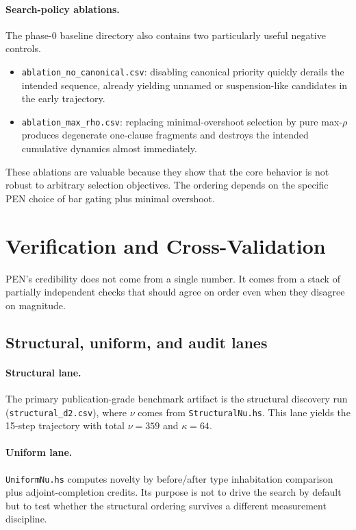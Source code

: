 \documentclass[11pt,a4paper]{article}
\begin{document}
\paragraph{Search-policy ablations.}
The phase-0 baseline directory also contains two particularly useful negative controls.
\begin{itemize}[nosep]
  \item \texttt{ablation\_no\_canonical.csv}: disabling canonical priority quickly derails the intended sequence, already yielding unnamed or suspension-like candidates in the early trajectory.
  \item \texttt{ablation\_max\_rho.csv}: replacing minimal-overshoot selection by pure max-$\rho$ produces degenerate one-clause fragments and destroys the intended cumulative dynamics almost immediately.
\end{itemize}
These ablations are valuable because they show that the core behavior is not robust to arbitrary selection objectives. The ordering depends on the specific PEN choice of bar gating plus minimal overshoot.

\section{Verification and Cross-Validation}
\label{sec:verification}

PEN's credibility does not come from a single number. It comes from a stack of partially independent checks that should agree on order even when they disagree on magnitude.

\subsection{Structural, uniform, and audit lanes}

\paragraph{Structural lane.}
The primary publication-grade benchmark artifact is the structural discovery run (\texttt{structural\_d2.csv}), where $\nu$ comes from \texttt{StructuralNu.hs}. This lane yields the 15-step trajectory with total $\nu=359$ and $\kappa=64$.

\paragraph{Uniform lane.}
\texttt{UniformNu.hs} computes novelty by before/after type inhabitation comparison plus adjoint-completion credits. Its purpose is not to drive the search by default but to test whether the structural ordering survives a different measurement discipline.
\end{document}
